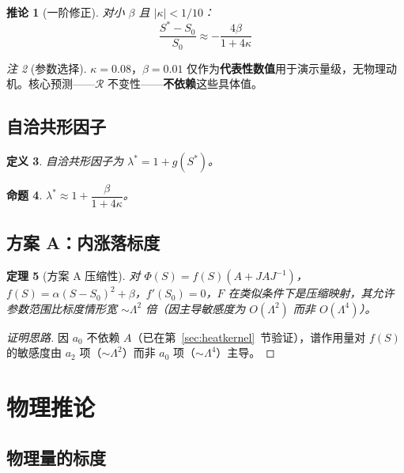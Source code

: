 \documentclass[11pt,a4paper]{ctexart}
\newtheorem{theorem}{定理}[section]
\newtheorem{proposition}[theorem]{命题}
\newtheorem{corollary}[theorem]{推论}
\newtheorem{definition}[theorem]{定义}
\theoremstyle{remark}
\newtheorem{remark}[theorem]{注}
\newcommand{\R}{\mathcal{R}}
\begin{document}
\begin{corollary}[一阶修正]
对小 $\beta$ 且 $|\kappa| < 1/10$：
\[
  \frac{S^* - S_0}{S_0} \approx -\frac{4\beta}{1 + 4\kappa}
\]
\end{corollary}

\begin{remark}[参数选择]
$\kappa = 0.08$，$\beta = 0.01$ 仅作为\textbf{代表性数值}用于演示量级，无物理动机。核心预测——$\R$ 不变性——\textbf{不依赖}这些具体值。
\end{remark}

\subsection{自洽共形因子}

\begin{definition}
自洽共形因子为 $\lambda^* = 1 + g(S^*)$。
\end{definition}

\begin{proposition}
$\lambda^* \approx 1 + \dfrac{\beta}{1+4\kappa}$。
\end{proposition}

\subsection{方案 A：内涨落标度}

\begin{theorem}[方案 A 压缩性]
对 $\Phi(S) = f(S)(A + JAJ^{-1})$，$f(S) = \alpha(S-S_0)^2 + \beta$，$f'(S_0) = 0$，$F$ 在类似条件下是压缩映射，其允许参数范围比标度情形宽 $\sim \Lambda^2$ 倍（因主导敏感度为 $O(\Lambda^2)$ 而非 $O(\Lambda^4)$）。
\end{theorem}

\begin{proof}[证明思路]
因 $a_0$ 不依赖 $A$（已在第~\ref{sec:heatkernel}~节验证），谱作用量对 $f(S)$ 的敏感度由 $a_2$ 项（$\sim \Lambda^2$）而非 $a_0$ 项（$\sim \Lambda^4$）主导。
\end{proof}

\section{物理推论}

\subsection{物理量的标度}
\end{document}
